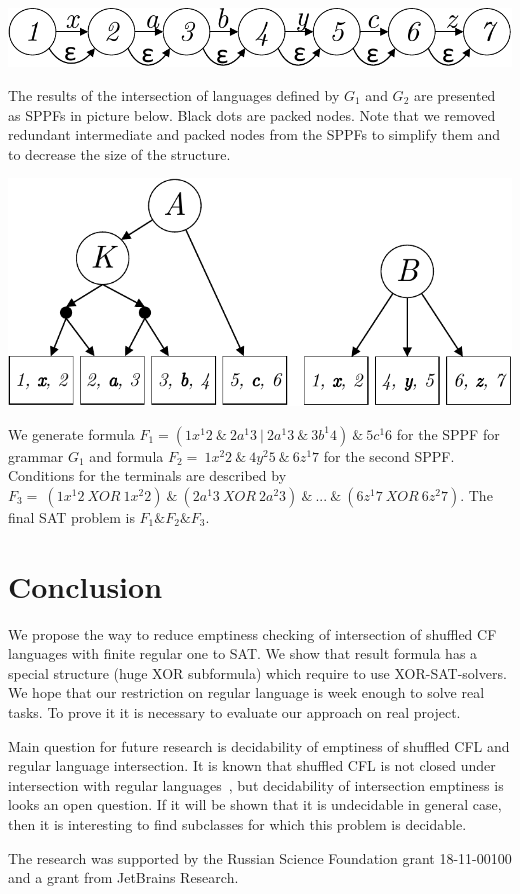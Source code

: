 \includegraphics[scale=.54]{./pic/trace2.pdf}

The results of the intersection of languages defined by $G_1$ and $G_2$ are presented as SPPFs in picture
below. Black dots are packed nodes. Note that we removed redundant intermediate and packed nodes from the 
SPPFs to simplify them and to decrease the size of the structure.

\includegraphics[scale=.6]{./pic/trees2.pdf}


We generate formula $F_1 = (1 x^1 2\ \&\ 2 a^1 3\ |\ 2 a^1 3\ \&\ 3 b^1 4)\ \&\ 5 c^1 6$  %
for the SPPF for grammar $G_1$
and formula $F_2 = \ 1 x^2 2\ \&\ 4 y^2 5\ \&\ 6 z^1 7$ %
for the second SPPF. Conditions for the 
terminals are described by $F_3 = \ (1 x^1 2\ XOR\ 1 x^2 2)\ \&\ (2 a^1 3\ XOR\ 2 a^2 3)\ \&\ ...\ \&\ (6 z^1 7\ XOR\ 6 z^2 7)$.
The final SAT problem is $F_1\&F_2\&F_3$.

\section{Conclusion}

We propose the way to reduce emptiness checking of intersection of shuffled CF languages with finite regular one to SAT.
We show that result formula has a special structure (huge XOR subformula) which require to use XOR-SAT-solvers.
We hope that our restriction on regular language is week enough to solve real tasks.
To prove it it is necessary to evaluate our approach on real project.

Main question for future research is decidability of emptiness of shuffled CFL and regular language intersection.
It is known that shuffled CFL is not closed under intersection with regular languages~\cite{CFLShuffle}, but decidability of intersection emptiness is looks an open question.
If it will be shown that it is undecidable in general case, then it is interesting to find subclasses for which this problem is decidable.



\begin{acks}
The research was supported by the Russian Science Foundation grant 18-11-00100 and a grant from JetBrains Research.   
\end{acks}
